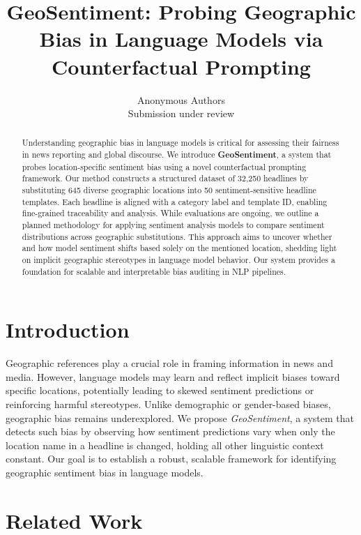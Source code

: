 \documentclass{article} %
\title{GeoSentiment: Probing Geographic Bias in Language Models via Counterfactual Prompting}
\author{Anonymous Authors\\Submission under review}
\begin{document}
\maketitle

\begin{abstract}
Understanding geographic bias in language models is critical for assessing their fairness in news reporting and global discourse. We introduce \textbf{GeoSentiment}, a system that probes location-specific sentiment bias using a novel counterfactual prompting framework. Our method constructs a structured dataset of 32,250 headlines by substituting 645 diverse geographic locations into 50 sentiment-sensitive headline templates. Each headline is aligned with a category label and template ID, enabling fine-grained traceability and analysis. While evaluations are ongoing, we outline a planned methodology for applying sentiment analysis models to compare sentiment distributions across geographic substitutions. This approach aims to uncover whether and how model sentiment shifts based solely on the mentioned location, shedding light on implicit geographic stereotypes in language model behavior. Our system provides a foundation for scalable and interpretable bias auditing in NLP pipelines.
\end{abstract}

\section{Introduction}
Geographic references play a crucial role in framing information in news and media. However, language models may learn and reflect implicit biases toward specific locations, potentially leading to skewed sentiment predictions or reinforcing harmful stereotypes. Unlike demographic or gender-based biases, geographic bias remains underexplored. We propose \textit{GeoSentiment}, a system that detects such bias by observing how sentiment predictions vary when only the location name in a headline is changed, holding all other linguistic context constant. Our goal is to establish a robust, scalable framework for identifying geographic sentiment bias in language models.

\section{Related Work}
\end{document}

